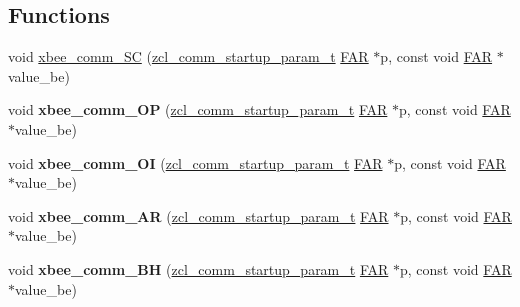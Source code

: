 \subsection*{Functions}
\begin{DoxyCompactItemize}
\item 
void \hyperlink{group__xbee__commissioning_ga886012f757de4a74d0c992d3ab04a373}{xbee\-\_\-comm\-\_\-\-S\-C} (\hyperlink{structzcl__comm__startup__param__t}{zcl\-\_\-comm\-\_\-startup\-\_\-param\-\_\-t} \hyperlink{group__hal_gaef060b3456fdcc093a7210a762d5f2ed}{F\-A\-R} $\ast$p, const void \hyperlink{group__hal_gaef060b3456fdcc093a7210a762d5f2ed}{F\-A\-R} $\ast$value\-\_\-be)
\item 
\hypertarget{group__xbee__commissioning_ga38cdf15db91d2b0d3afc7288c4f4205a}{void {\bfseries xbee\-\_\-comm\-\_\-\-O\-P} (\hyperlink{structzcl__comm__startup__param__t}{zcl\-\_\-comm\-\_\-startup\-\_\-param\-\_\-t} \hyperlink{group__hal_gaef060b3456fdcc093a7210a762d5f2ed}{F\-A\-R} $\ast$p, const void \hyperlink{group__hal_gaef060b3456fdcc093a7210a762d5f2ed}{F\-A\-R} $\ast$value\-\_\-be)}\label{group__xbee__commissioning_ga38cdf15db91d2b0d3afc7288c4f4205a}

\item 
\hypertarget{group__xbee__commissioning_ga9b5ced283d3e0d514a28b676935a3b95}{void {\bfseries xbee\-\_\-comm\-\_\-\-O\-I} (\hyperlink{structzcl__comm__startup__param__t}{zcl\-\_\-comm\-\_\-startup\-\_\-param\-\_\-t} \hyperlink{group__hal_gaef060b3456fdcc093a7210a762d5f2ed}{F\-A\-R} $\ast$p, const void \hyperlink{group__hal_gaef060b3456fdcc093a7210a762d5f2ed}{F\-A\-R} $\ast$value\-\_\-be)}\label{group__xbee__commissioning_ga9b5ced283d3e0d514a28b676935a3b95}

\item 
\hypertarget{group__xbee__commissioning_gaa49a8990f5c4b47e2000f49b2258fc2c}{void {\bfseries xbee\-\_\-comm\-\_\-\-A\-R} (\hyperlink{structzcl__comm__startup__param__t}{zcl\-\_\-comm\-\_\-startup\-\_\-param\-\_\-t} \hyperlink{group__hal_gaef060b3456fdcc093a7210a762d5f2ed}{F\-A\-R} $\ast$p, const void \hyperlink{group__hal_gaef060b3456fdcc093a7210a762d5f2ed}{F\-A\-R} $\ast$value\-\_\-be)}\label{group__xbee__commissioning_gaa49a8990f5c4b47e2000f49b2258fc2c}

\item 
\hypertarget{group__xbee__commissioning_gae214f43be9de8be54815b9351935202f}{void {\bfseries xbee\-\_\-comm\-\_\-\-B\-H} (\hyperlink{structzcl__comm__startup__param__t}{zcl\-\_\-comm\-\_\-startup\-\_\-param\-\_\-t} \hyperlink{group__hal_gaef060b3456fdcc093a7210a762d5f2ed}{F\-A\-R} $\ast$p, const void \hyperlink{group__hal_gaef060b3456fdcc093a7210a762d5f2ed}{F\-A\-R} $\ast$value\-\_\-be)}\label{group__xbee__commissioning_gae214f43be9de8be54815b9351935202f}


\end{DoxyCompactItemize}

